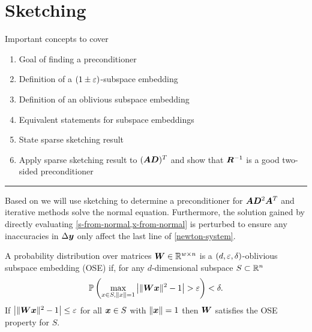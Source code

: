 \chapter{Sketching}

Important concepts to cover
\begin{enumerate}
  \item Goal of finding a preconditioner
  \item Definition of a \((1\pm\varepsilon)\)-subspace embedding
  \item Definition of an oblivious subspace embedding
  \item Equivalent statements for subspace embeddings
  \item State sparse sketching result
  \item Apply sparse sketching result to \((\bm{A}\bm{D})^T\) and show that \(\bm{R}^{-1}\) is a good two-sided preconditioner
\end{enumerate}

\hrule

Based on \cite{Avron-FasterRandomizedInfeasibleIPMs} we will use sketching to determine a preconditioner for \(\bm{A} \bm{D}^2 \bm{A}^T\) and iterative methods solve the normal equation. Furthermore, the solution gained by directly evaluating \cref{s-from-normal,x-from-normal} is perturbed to ensure any inaccuracies in \(\Delta\bm{y}\) only affect the last line of \cref{newton-system}.


\begin{definition} \label{def:oblivious-subspace-embedding}
A probability distribution over matrices \(\bm{W} \in \mathbb{R}^{w \times n}\) is a \((d, \varepsilon, \delta)\)-oblivious subspace embedding (OSE) if, for any \(d\)-dimensional subspace \(S \subset \mathbb{R}^n\) 
\[ \mathbb{P} \left(  \max_{x \in S, \lVert x \rVert = 1} \left\lvert  \lVert \bm{W}\bm{x} \rVert^2 - 1 \right\rvert > \varepsilon  \right) < \delta. \]
If \(\left\lvert  \lVert \bm{W}\bm{x} \rVert^2 - 1 \right\rvert \leq \varepsilon\) for all \(\bm{x} \in S\) with \(\lVert \bm{x} \rVert = 1\) then \(\bm{W}\) satisfies the OSE property for \(S\).
\end{definition}

